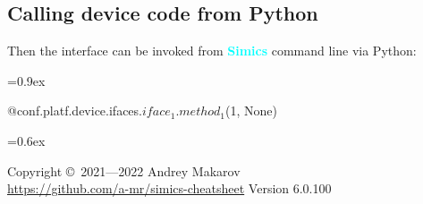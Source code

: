 \documentclass[8pt]{extarticle}
\newenvironment{code}[1][]{%
\begin{prebox}[#1]\obeylines%
\fontdimen2\font=0.9ex%
}{%
\end{prebox}%
\fontdimen2\font=0.6ex%
}
\newcommand{\Simics}{\textcolor{cyan}{\textbf{Simics}}}
\begin{document}
\begin{multicols*}{3}
\subsection{Calling device code from Python}

Then the interface can be invoked from \Simics{} command line via Python:
\begin{code}
    @conf.platf.device.ifaces.$iface_1$.$method_1$(1, None)
\end{code}

Copyright \copyright\ 2021—2022 Andrey Makarov \\
\href{https://github.com/a-mr/simics-cheatsheet}{https://github.com/a-mr/simics-cheatsheet}
Version 6.0.100

\end{multicols*}
\end{document}
